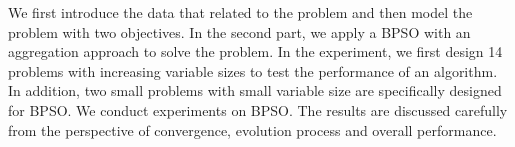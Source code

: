 We first introduce the data that related to the problem and then model the problem with two objectives. In the second part, we apply a BPSO with 
an aggregation approach to solve the problem. In the experiment, we first design 14 problems with increasing variable sizes 
to test the performance of an algorithm. In addition, two small problems with small variable size are specifically designed for BPSO. 
We conduct experiments on BPSO. The results are discussed carefully from the perspective of convergence, evolution process and overall performance.
% 
% 
% 
% 
% 

